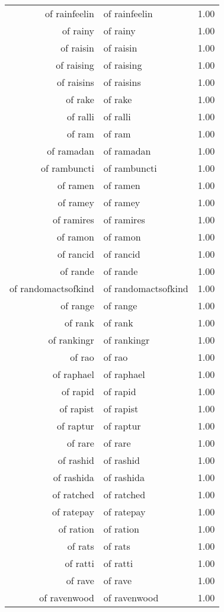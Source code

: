 \begin{table}[ht]
\begin{tabular}{rlr}
  of rainfeelin & of rainfeelin & 1.00 \\ 
  of rainy & of rainy & 1.00 \\ 
  of raisin & of raisin & 1.00 \\ 
  of raising & of raising & 1.00 \\ 
  of raisins & of raisins & 1.00 \\ 
  of rake & of rake & 1.00 \\ 
  of ralli & of ralli & 1.00 \\ 
  of ram & of ram & 1.00 \\ 
  of ramadan & of ramadan & 1.00 \\ 
  of rambuncti & of rambuncti & 1.00 \\ 
  of ramen & of ramen & 1.00 \\ 
  of ramey & of ramey & 1.00 \\ 
  of ramires & of ramires & 1.00 \\ 
  of ramon & of ramon & 1.00 \\ 
  of rancid & of rancid & 1.00 \\ 
  of rande & of rande & 1.00 \\ 
  of randomactsofkind & of randomactsofkind & 1.00 \\ 
  of range & of range & 1.00 \\ 
  of rank & of rank & 1.00 \\ 
  of rankingr & of rankingr & 1.00 \\ 
  of rao & of rao & 1.00 \\ 
  of raphael & of raphael & 1.00 \\ 
  of rapid & of rapid & 1.00 \\ 
  of rapist & of rapist & 1.00 \\ 
  of raptur & of raptur & 1.00 \\ 
  of rare & of rare & 1.00 \\ 
  of rashid & of rashid & 1.00 \\ 
  of rashida & of rashida & 1.00 \\ 
  of ratched & of ratched & 1.00 \\ 
  of ratepay & of ratepay & 1.00 \\ 
  of ration & of ration & 1.00 \\ 
  of rats & of rats & 1.00 \\ 
  of ratti & of ratti & 1.00 \\ 
  of rave & of rave & 1.00 \\ 
  of ravenwood & of ravenwood & 1.00 \\ 

\end{tabular}
\end{table}
